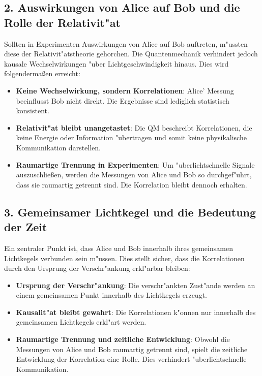 \documentclass[12pt,a4paper]{article}
\begin{document}
\subsection*{2. Auswirkungen von Alice auf Bob und die Rolle der Relativit"at}
Sollten in Experimenten Auswirkungen von Alice auf Bob auftreten, m"ussten diese der Relativit"atstheorie gehorchen. Die Quantenmechanik verhindert jedoch kausale Wechselwirkungen "uber Lichtgeschwindigkeit hinaus. Dies wird folgenderma\ss en erreicht:
\begin{itemize}
	\item \textbf{Keine Wechselwirkung, sondern Korrelationen}: Alice’ Messung beeinflusst Bob nicht direkt. Die Ergebnisse sind lediglich statistisch konsistent.
	\item \textbf{Relativit"at bleibt unangetastet}: Die QM beschreibt Korrelationen, die keine Energie oder Information "ubertragen und somit keine physikalische Kommunikation darstellen.
	\item \textbf{Raumartige Trennung in Experimenten}: Um "uberlichtschnelle Signale auszuschlie\ss en, werden die Messungen von Alice und Bob so durchgef"uhrt, dass sie raumartig getrennt sind. Die Korrelation bleibt dennoch erhalten.
\end{itemize}

\subsection*{3. Gemeinsamer Lichtkegel und die Bedeutung der Zeit}
Ein zentraler Punkt ist, dass Alice und Bob innerhalb ihres gemeinsamen Lichtkegels verbunden sein m"ussen. Dies stellt sicher, dass die Korrelationen durch den Ursprung der Verschr"ankung erkl"arbar bleiben:
\begin{itemize}
	\item \textbf{Ursprung der Verschr"ankung}: Die verschr"ankten Zust"ande werden an einem gemeinsamen Punkt innerhalb des Lichtkegels erzeugt.
	\item \textbf{Kausalit"at bleibt gewahrt}: Die Korrelationen k"onnen nur innerhalb des gemeinsamen Lichtkegels erkl"art werden.
	\item \textbf{Raumartige Trennung und zeitliche Entwicklung}: Obwohl die Messungen von Alice und Bob raumartig getrennt sind, spielt die zeitliche Entwicklung der Korrelation eine Rolle. Dies verhindert "uberlichtschnelle Kommunikation.
\end{itemize}
\end{document}
